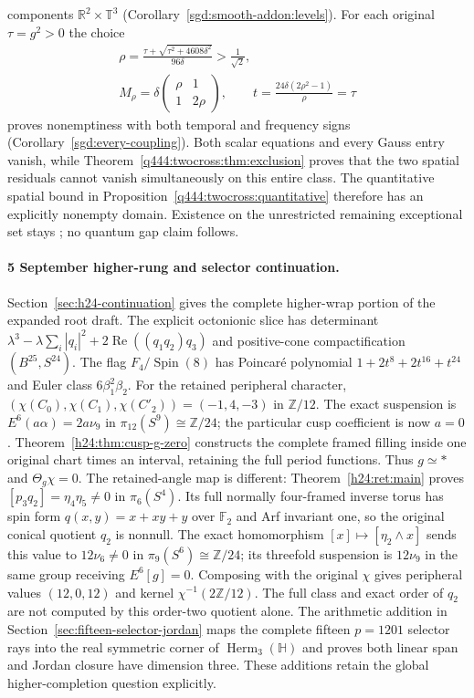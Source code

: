 components $\mathbb R^2\times\mathbb T^3$
(Corollary~\ref{sgd:smooth-addon:levels}).
For each original $\tau=g^2>0$ the choice
\[
 \begin{gathered}
 \rho=\frac{\tau+\sqrt{\tau^2+4608\delta^2}}{96\delta}
       >\frac1{\sqrt2},\\
 M_\rho=\delta\begin{pmatrix}\rho&1\\1&2\rho\end{pmatrix},\qquad
 t=\frac{24\delta(2\rho^2-1)}\rho=\tau
 \end{gathered}
\]
proves nonemptiness with both temporal and frequency signs
(Corollary~\ref{sgd:every-coupling}). Both scalar equations and every
Gauss entry vanish, while Theorem~\ref{q444:twocross:thm:exclusion}
proves that the two spatial residuals cannot vanish simultaneously
on this entire class.
The quantitative spatial bound in
Proposition~\ref{q444:twocross:quantitative} therefore has an explicitly
nonempty domain. Existence on the unrestricted remaining exceptional
set stays \Open; no quantum gap claim follows.

\paragraph{5 September higher-rung and selector continuation.}
Section~\ref{sec:h24-continuation} gives the complete higher-wrap portion
of the expanded root draft.
The explicit octonionic slice has determinant
$\lambda^3-\lambda\sum_i|q_i|^2+2\operatorname{Re}((q_1q_2)q_3)$
and positive-cone compactification $(B^{25},S^{24})$.
The flag $F_4/\operatorname{Spin}(8)$ has Poincar\'e polynomial
$1+2t^8+2t^{16}+t^{24}$ and Euler class $6\beta_1^2\beta_2$.
For the retained peripheral character,
$(\chi(C_0),\chi(C_1),\chi(C'_2))=(-1,4,-3)$ in $\mathbb Z/12$.
The exact suspension is $E^6(a\alpha)=2a\nu_9$ in
$\pi_{12}(S^9)\cong\mathbb Z/24$; the particular cusp coefficient is
now $a=0$. Theorem~\ref{h24:thm:cusp-g-zero} constructs the complete
framed filling inside one original chart times an interval, retaining
the full period functions. Thus $g\simeq *$ and $\Theta_g\chi=0$.
The retained-angle map is different: Theorem~\ref{h24:ret:main}
proves $[p_3q_2]=\eta_4\eta_5\ne0$ in $\pi_6(S^4)$.
Its full normally four-framed inverse torus has spin form
$q(x,y)=x+xy+y$ over $\mathbb F_2$ and Arf invariant one,
so the original conical quotient $q_2$ is nonnull. The exact
homomorphism $[x]\mapsto[\eta_2\wedge x]$ sends this value to
$12\nu_6\ne0$ in $\pi_9(S^6)\cong\mathbb Z/24$; its
threefold suspension is $12\nu_9$ in the same group receiving
$E^6[g]=0$. Composing with the original $\chi$ gives peripheral
values $(12,0,12)$ and kernel $\chi^{-1}(2\mathbb Z/12)$.
The full class and exact order of $q_2$ are not computed by this
order-two quotient alone.
The arithmetic addition in
Section~\ref{sec:fifteen-selector-jordan} maps the complete fifteen
$p=1201$ selector rays into the real symmetric corner of
$\operatorname{Herm}_3(\mathbb H)$ and proves both linear span and
Jordan closure have dimension three. These additions retain the global
higher-completion question explicitly.

